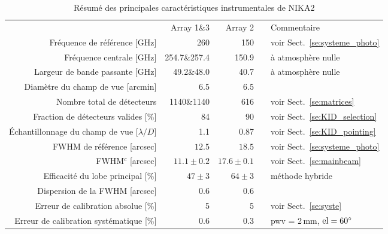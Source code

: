 \begin{table}[!thbp]
  \caption{Résumé des principales caractéristiques instrumentales de NIKA2}
  \label{tab:nika2summary}
  \centering    
  \begin{tabular}{rrrcl}
  \hline\hline
  \noalign{\smallskip}
  & Array 1\&3 & Array 2 & & Commentaire \\
  \noalign{\smallskip}
  \hline
  \noalign{\smallskip}
  Fréquence de référence [GHz]  & 260  & 150   &  & \footnotesize{voir Sect.~\ref{se:systeme_photo}}  \\
  Fréquence centrale [GHz]      &  254.7\&257.4  & 150.9 &  & \footnotesize{à atmosphère nulle}   \\
  Largeur de bande passante  [GHz]     &   49.2\&48.0   & 40.7  &  & \footnotesize{à atmosphère nulle} \\
  \hline
  \noalign{\smallskip}
  Diamètre du champ de vue     [arcmin] &   6.5       &   6.5   &  &  \\  
  Nombre total de détecteurs            &  1140\&1140 &    616  & & \footnotesize{voir Sect.~\ref{se:matrices}}\\
  Fraction de détecteurs valides [$\%$] &  84         &     90  & & \footnotesize{voir Sect.~\ref{se:KID_selection}} \\
  Échantillonnage du champ de vue \hspace{3mm} [$\lambda/D$] & 1.1 &  0.87 & & \footnotesize{voir Sect.~\ref{se:KID_pointing}} \\
  \hline
  \noalign{\smallskip}
  FWHM de référence\hspace{3mm} [arcsec]          & $12.5$     &   $18.5$  &  & \footnotesize{voir Sect.~\ref{se:systeme_photo}}\\
  FWHM$^c$\hspace{3mm} [arcsec]    &  $11.1 \pm 0.2$  &  $17.6 \pm 0.1$  & & \footnotesize{voir Sect.~\ref{se:mainbeam}}\\
  Efficacité du lobe principal \hspace{3mm} [$\%$] &  $47 \pm 3$   & $64 \pm 3$  &  & \footnotesize{méthode hybride}\\
  Dispersion de la FWHM [arcsec]  &    0.6        &      0.6        & & \footnotesize{\citet{Adam2018}} \\
  \hline
  \noalign{\smallskip}
  Erreur de calibration absolue [\%]      &   5         & 5 & &  \footnotesize{voir Sect.~\ref{se:syste}}\\
  Erreur de calibration systématique\hspace{3mm}  [\%]      &    0.6        & 0.3 & & \footnotesize{pwv = 2\,mm, $\rm{el} = 60^{\circ}$} \\

\end{tabular}
\end{table}
